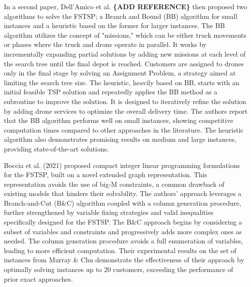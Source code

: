 \documentclass{article}
\begin{document}
	\par
	In a second paper, Dell'Amico et al. \textbf{\{ADD REFERENCE\}} then proposed two algorithms to solve the FSTSP; a Branch and Bound (BB) algorithm for small instances and a heuristic based on the former for larger instances. The BB algorithm utilizes the concept of "missions," which can be either truck movements or phases where the truck and drone operate in parallel. It works by incrementally expanding partial solutions by adding new missions at each level of the search tree until the final depot is reached. Customers are assigned to drones only in the final stage by solving an Assignment Problem, a strategy aimed at limiting the search tree size. The heuristic, heavily based on BB, starts with an initial feasible TSP solution and repeatedly applies the BB method as a subroutine to improve the solution. It is designed to iteratively refine the solution by adding drone services to optimize the overall delivery time. The authors report that the BB algorithm performs well on small instances, showing competitive computation times compared to other approaches in the literature. The heuristic algorithm also demonstrates promising results on medium and large instances, providing state-of-the-art solutions.
	\par
 	Boccia et al. (2021) proposed compact integer linear programming formulations for the FSTSP, built on a novel extended graph representation. This representation avoids the use of big-M constraints, a common drawback of existing models that hinders their solvability. The authors' approach leverages a Branch-and-Cut (B\&C) algorithm coupled with a column generation procedure, further strengthened by variable fixing strategies and valid inequalities specifically designed for the FSTSP. The B\&C approach begins by considering a subset of variables and constraints and progressively adds more complex ones as needed. The column generation procedure avoids a full enumeration of variables, leading to more efficient computation. Their experimental results on the set of instances from Murray \& Chu demonstrate the effectiveness of their approach by optimally solving instances up to 20 customers, exceeding the performance of prior exact approaches.
	\par
\end{document}

